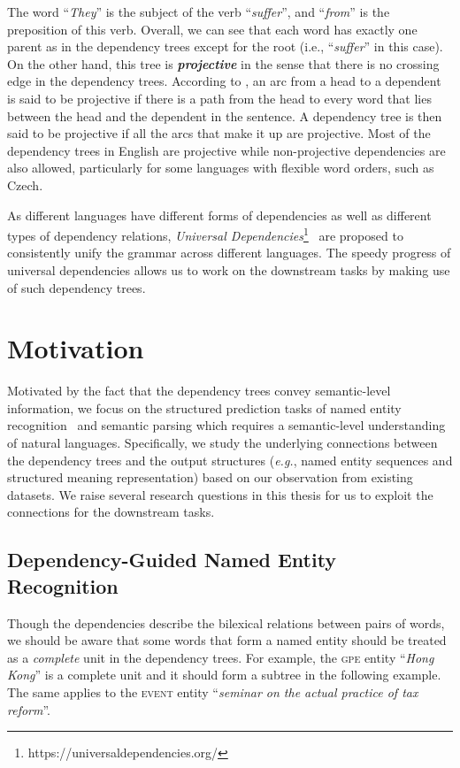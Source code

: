 The word ``\textit{They}'' is the subject of the verb ``\textit{suffer}'', and ``\textit{from}'' is the preposition of this verb. 
Overall, we can see that each word has exactly one parent as in the dependency trees except for the root (i.e., ``\textit{suffer}'' in this case).
On the other hand, this tree is \textbf{\textit{projective}} in the sense that there is no crossing edge in the dependency trees. 
According to \citet{jurafsky2000speech}, an arc from a head to a dependent is said to be projective if there is a path from the head to every word that lies between the head and the dependent in the sentence. 
A dependency tree is then said to be projective if all the arcs that make it up are projective. 
Most of the dependency trees in English are projective while non-projective dependencies are also allowed, particularly for some languages with flexible word orders, such as Czech.

As different languages have different forms of dependencies as well as different types of dependency relations, \textit{Universal Dependencies}\footnote{https://universaldependencies.org/}~\cite{nivre2016universal} are proposed to consistently unify the grammar across different languages.
The speedy progress of universal dependencies allows us to work on the downstream tasks by making use of such dependency trees. 



\section{Motivation}



Motivated by the fact that the dependency trees convey semantic-level information, we focus on the structured prediction tasks of named entity recognition~\cite{tjong2003introduction} and semantic parsing which requires a semantic-level understanding of natural languages. 
Specifically, we study the underlying connections between the dependency trees and the output structures (\textit{e.g.}, named entity sequences and structured meaning representation) based on our observation from existing datasets. 
We raise several research questions in this thesis for us to exploit the connections for the downstream tasks. 


\subsection{Dependency-Guided Named Entity Recognition}
Though the dependencies describe the bilexical relations between pairs of words, we should be aware that some words that form a named entity should be treated as a \textit{complete} unit in the dependency trees. 
For example, the \textsc{gpe} entity ``\textit{Hong Kong}'' is a complete unit and it should form a subtree in the following example. 
The same applies to the \textsc{event} entity ``\textit{seminar on the actual practice of tax reform}''. 

